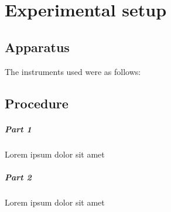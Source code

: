 \chapter{Experimental setup}

\section{Apparatus}

The instruments used were as follows:

\begin{lrapparatus}
    \item
\end{lrapparatus}

\section{Procedure}

\paragraph{Part 1}
Lorem ipsum dolor sit amet

\paragraph{Part 2}
Lorem ipsum dolor sit amet


